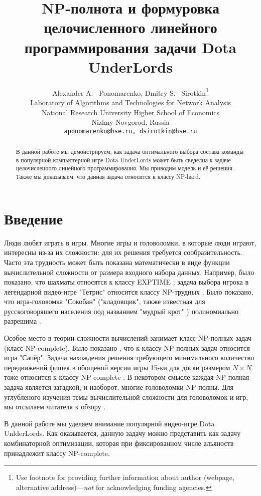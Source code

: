 \documentclass{article}
\title{NP-полнота и формуровка целочисленного линейного программирования задачи Dota UnderLords}
\author{
  Alexander A. ~Ponomarenko, Dmitry S. ~Sirotkin\thanks{Use footnote for providing further
    information about author (webpage, alternative
    address)---\emph{not} for acknowledging funding agencies.} \\
  Laboratory of Algorithms and Technologies for Network Analysis\\
  National Research University Higher School of Economics \\
  Nizhny Novgorod, Russia\\
  \texttt{aponomarenko@hse.ru, dsirotkin@hse.ru} \\
}
\begin{document}
\maketitle

\begin{abstract}
В данной работе мы демонстрируем, как задача оптимального выбора состава команды в популярной компьютерной игре Dota UnderLords может быть сведелна к задаче целочисленного линейного программирования. Мы приводим модель и её решения. Также мы доказываем, что данная задача относится к классу NP-hard. 
\end{abstract}




\section{Введение}

Люди любят играть в игры. Многие игры и головоломки, в которые люди играют, интересны из-за их сложности: для их решения требуется сообразительность. Часто эта трудность может быть показана математически в виде функции вычислительной сложности от размера входного набора данных. Например, было показано, что шахматы относятся к классу EXPTIME \cite{fraenkel1981computing}; задача выбора игрока  в легендарной видео-игре "Тетрис" относится классу NP-трудных \cite{breukelaar2004tetris}. Было показано, что игра-головомка "Сокобан" ("кладовщик", также известная для русскоговоряшего населения под названием "мудрый крот" ) полиномиально разрешима \cite{hearn2005pspace}.

Особое место в теории сложности вычислений занимает класс NP-полных задач (класс NP-complete). %
Было показано  \cite{kaye2000minesweeper}, что к классу NP-полных задач относится игра "Сапёр". Задача нахождения решения требующего минимального количество передвижений фишек в обощеной версии игры 15-ки для доски размером $N \times N$ тоже относится к классу NP-complete \cite{ratner1986finding}. 
В некотором смысле каждая NP-полная задача является загадкой, и наоборот, многие головоломки NP-полны. Для углубленого изучения темы вычислительной сложности для головоломок и игр, мы отсылаем читателя к обзору  \cite{costa2018computational}.

В данной работе мы уделяем внимание популярной видео-игре Dota UnlderLords. 
Как оказывается, данную задачу можно представить как задачу комбинаторной оптимизации, которая при фиксированном числе альяноств принадлежит классу NP-complete.
\end{document}
